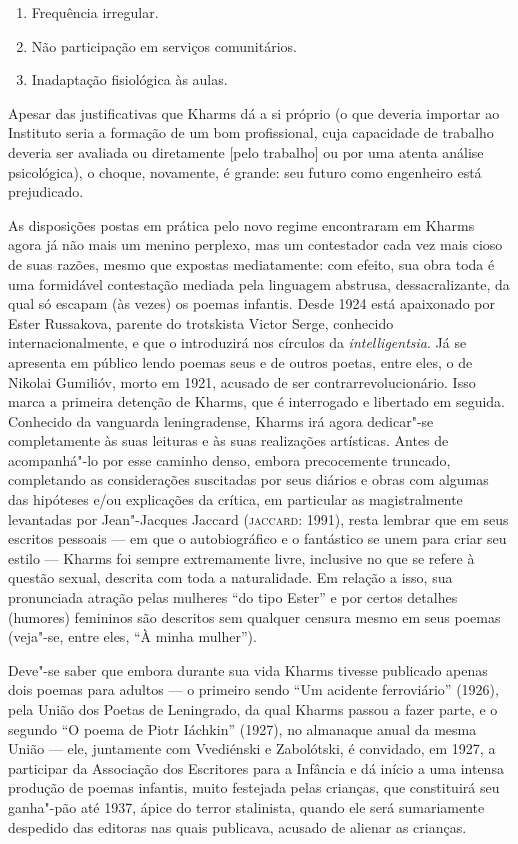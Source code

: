 \begin{enumerate}
\def\labelenumi{\arabic{enumi})}
\item
  Frequência irregular.
\item
  Não participação em serviços comunitários.
\item
  Inadaptação fisiológica às aulas.
\end{enumerate}

Apesar das justificativas que Kharms dá a si próprio (o que deveria
importar ao Instituto seria a formação de um bom profissional, cuja
capacidade de trabalho deveria ser avaliada ou diretamente [pelo
trabalho] ou por uma atenta análise psicológica), o choque, novamente, é
grande: seu futuro como engenheiro está prejudicado.

As disposições postas em prática pelo novo regime encontraram em Kharms
agora já não mais um menino perplexo, mas um contestador cada vez mais
cioso de suas razões, mesmo que expostas mediatamente: com efeito, sua
obra toda é uma formidável contestação mediada pela linguagem abstrusa,
dessacralizante, da qual só escapam (às vezes) os poemas infantis. Desde
1924 está apaixonado por Ester Russakova, parente do trotskista Victor
Serge, conhecido internacionalmente, e que o introduzirá nos círculos da
\emph{intelligentsia}. Já se apresenta em público lendo poemas seus e de
outros poetas, entre eles, o de Nikolai Gumilióv, morto em 1921, acusado
de ser contrarrevolucionário. Isso marca a primeira detenção de Kharms,
que é interrogado e libertado em seguida. Conhecido da vanguarda
leningradense, Kharms irá agora dedicar"-se completamente às suas
leituras e às suas realizações artísticas. Antes de acompanhá"-lo por
esse caminho denso, embora precocemente truncado, completando as
considerações suscitadas por seus diários e obras com algumas das hipóteses e/ou explicações da crítica, em
particular as magistralmente levantadas por Jean"-Jacques Jaccard
(\textsc{jaccard}: 1991), resta lembrar que em seus escritos pessoais ---
em que o autobiográfico e o fantástico se unem para criar seu estilo ---
Kharms foi sempre extremamente livre, inclusive no que se refere à
questão sexual, descrita com toda a naturalidade. Em relação a isso, sua
pronunciada atração pelas mulheres ``do tipo Ester'' e por certos
detalhes (humores) femininos são descritos sem qualquer censura mesmo em
seus poemas (veja"-se, entre eles, ``À minha mulher'').

Deve"-se saber que embora durante sua vida Kharms tivesse publicado
apenas dois poemas para adultos --- o primeiro sendo ``Um acidente
ferroviário'' (1926), pela União dos Poetas de Leningrado, da qual
Kharms passou a fazer parte, e o segundo ``O poema de Piotr Iáchkin''
(1927), no almanaque anual da mesma União --- ele, juntamente com
Vvediénski e Zabolótski, é convidado, em 1927, a participar da
Associação dos Escritores para a Infância e dá início a uma intensa
produção de poemas infantis, muito festejada pelas crianças, que
constituirá seu ganha"-pão até 1937, ápice do terror stalinista, quando
ele será sumariamente despedido das editoras nas quais publicava,
acusado de alienar as crianças.

